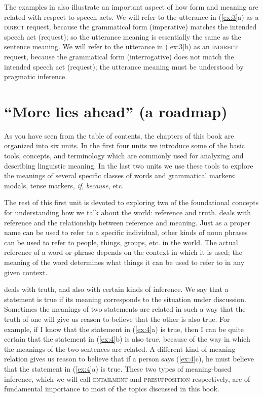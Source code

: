 The examples in  also illustrate an important aspect of how form and meaning are related with respect to speech acts. We will refer to the utterance in (\ref{ex:3}a) as a \textsc{direct} request, because the grammatical form (imperative) matches the intended speech act (request); so the utterance meaning is essentially the same as the sentence meaning. We will refer to the utterance in (\ref{ex:3}b) as an \textsc{indirect} request, because the grammatical form (interrogative) does not match the intended speech act (request); the utterance meaning must be understood by pragmatic inference.


\section{“More lies ahead” (a roadmap)}\label{sec:1.6}

As you have seen from the table of contents, the chapters of this book are organized into six units. In the first four units we introduce some of the basic tools, concepts, and terminology which are commonly used for analyzing and describing linguistic meaning. In the last two units we use these tools to explore the meanings of several specific classes of words and grammatical markers: modals, tense markers, \textit{if}, \textit{because}, etc.



The rest of this first unit is devoted to exploring two of the foundational concepts for understanding how we talk about the world: reference and truth.  deals with reference and the relationship between reference and meaning. Just as a proper name can be used to refer to a specific individual, other kinds of noun phrases can be used to refer to people, things, groups, etc. in the world. The actual reference of a word or phrase depends on the context in which it is used; the meaning of the word determines what things it can be used to refer to in any given context.



 deals with truth, and also with certain kinds of inference. We say that a statement is true if its meaning corresponds to the situation under discussion. Sometimes the meanings of two statements are related in such a way that the truth of one will give us reason to believe that the other is also true. For example, if I know that the statement in (\ref{ex:4}a) is true, then I can be quite certain that the statement in (\ref{ex:4}b) is also true, because of the way in which the meanings of the two sentences are related. A different kind of meaning relation gives us reason to believe that if a person says (\ref{ex:4}c), he must believe that the statement in (\ref{ex:4}a) is true. These two types of meaning-based inference, which we will call \textsc{entailment} and \textsc{presupposition} respectively, are of fundamental importance to most of the topics discussed in this book.


